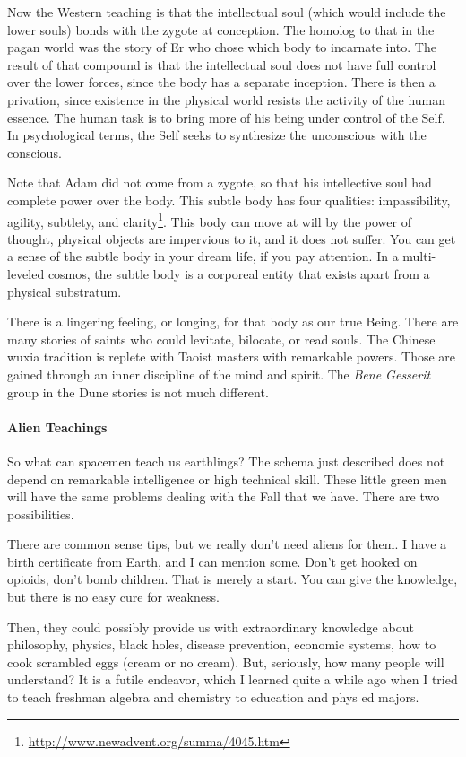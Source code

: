 Now the Western teaching is that the intellectual soul (which would include the lower souls) bonds with the zygote at conception. The homolog to that in the pagan world was the story of Er who chose which body to incarnate into. The result of that compound is that the intellectual soul does not have full control over the lower forces, since the body has a separate inception. There is then a privation, since existence in the physical world resists the activity of the human essence. The human task is to bring more of his being under control of the Self. In psychological terms, the Self seeks to synthesize the unconscious with the conscious.

Note that Adam did not come from a zygote, so that his intellective soul had complete power over the body. This subtle body has four qualities: impassibility, agility, subtlety, and clarity\footnote{\url{http://www.newadvent.org/summa/4045.htm}}. This body can move at will by the power of thought, physical objects are impervious to it, and it does not suffer. You can get a sense of the subtle body in your dream life, if you pay attention. In a multi-leveled cosmos, the subtle body is a corporeal entity that exists apart from a physical substratum.

There is a lingering feeling, or longing, for that body as our true Being. There are many stories of saints who could levitate, bilocate, or read souls. The Chinese wuxia tradition is replete with Taoist masters with remarkable powers. Those are gained through an inner discipline of the mind and spirit. The \emph{Bene Gesserit} group in the Dune stories is not much different.

\paragraph{Alien Teachings}


So what can spacemen teach us earthlings? The schema just described does not depend on remarkable intelligence or high technical skill. These little green men will have the same problems dealing with the Fall that we have. There are two possibilities.

There are common sense tips, but we really don't need aliens for them. I have a birth certificate from Earth, and I can mention some. Don't get hooked on opioids, don't bomb children. That is merely a start. You can give the knowledge, but there is no easy cure for weakness.

Then, they could possibly provide us with extraordinary knowledge about philosophy, physics, black holes, disease prevention, economic systems, how to cook scrambled eggs (cream or no cream). But, seriously, how many people will understand? It is a futile endeavor, which I learned quite a while ago when I tried to teach freshman algebra and chemistry to education and phys ed majors.

